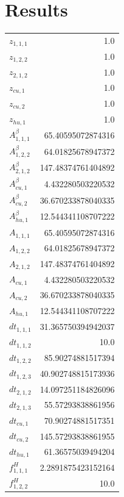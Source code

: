 \documentclass{article}%
\makeatletter
\let\mcnewpage=\newpage%
\newcommand{\TrickSupertabularIntoMulticols}{%
\renewcommand\newpage{%
\if@firstcolumn%
\hrule width\linewidth height0pt%
\columnbreak%
\else%
\mcnewpage%
\fi%
}%
}%
\makeatother
\begin{document}
\section{Results}%
\thispagestyle{plain}%
\begin{multicols*}{3}%
\TrickSupertabularIntoMulticols%
%
\begin{supertabular}{lr}%
	$z_{1,1,1}$ & 1.0 \\%
	$z_{1,2,2}$ & 1.0 \\%
	$z_{2,1,2}$ & 1.0 \\%
	$z_{cu,1}$ & 1.0 \\%
	$z_{cu,2}$ & 1.0 \\%
	$z_{hu,1}$ & 1.0 \\%
	$A_{1,1,1}^{\beta}$ & 65.40595072874316 \\%
	$A_{1,2,2}^{\beta}$ & 64.01825678947372 \\%
	$A_{2,1,2}^{\beta}$ & 147.48374761404892 \\%
	$A_{cu,1}^{\beta}$ & 4.432280503220532 \\%
	$A_{cu,2}^{\beta}$ & 36.670233878040335 \\%
	$A_{hu,1}^{\beta}$ & 12.544341108707222 \\%
	$A_{1,1,1}$ & 65.40595072874316 \\%
	$A_{1,2,2}$ & 64.01825678947372 \\%
	$A_{2,1,2}$ & 147.48374761404892 \\%
	$A_{cu,1}$ & 4.432280503220532 \\%
	$A_{cu,2}$ & 36.670233878040335 \\%
	$A_{hu,1}$ & 12.544341108707222 \\%
	$dt_{1,1,1}$ & 31.365750394942037 \\%
	$dt_{1,1,2}$ & 10.0 \\%
	$dt_{1,2,2}$ & 85.90274881517394 \\%
	$dt_{1,2,3}$ & 40.902748815173936 \\%
	$dt_{2,1,2}$ & 14.097251184826096 \\%
	$dt_{2,1,3}$ & 55.57293838861956 \\%
	$dt_{cu,1}$ & 70.90274881517351 \\%
	$dt_{cu,2}$ & 145.57293838861955 \\%
	$dt_{hu,1}$ & 61.36575039494204 \\%
	$f_{1,1,1}^{H}$ & 2.2891875423152164 \\%
	$f_{1,2,2}^{H}$ & 10.0 \\%

\end{supertabular}
\end{multicols*}
\end{document}
